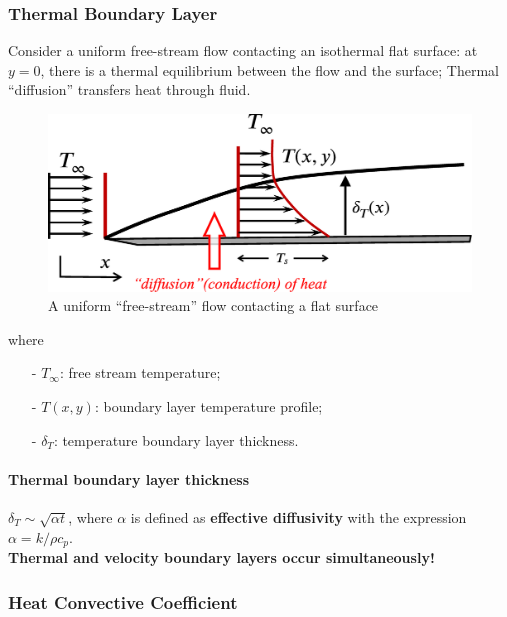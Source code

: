 \documentclass[12pt, a4paper]{article}
\numberwithin{equation}{subsection}
\begin{document}
\subsubsection{Thermal Boundary Layer}
Consider a uniform free-stream flow contacting an isothermal flat surface: at $y=0$, there is a thermal equilibrium between the flow and the surface; Thermal “diffusion” transfers heat through fluid. 
\begin{figure}[H]
    \centering
    \includegraphics[width=.7\textwidth]{img/thermal_boundary_layer.eps}
    \caption{A uniform “free-stream” flow contacting a flat surface}
    \label{fig:thermal_BL}
\end{figure}
where 
\begin{itemize}
    \item[-] $T_\infty$: free stream temperature;
    \item[-] $T(x, y)$: boundary layer temperature profile;
    \item[-] $\delta_T$: temperature boundary layer thickness.
\end{itemize}

\paragraph{Thermal boundary layer thickness} $\delta_{T} \sim \sqrt{\alpha t}$, where $\alpha$ is defined as \textbf{effective diffusivity} with the expression $\alpha= k/\rho c_{p}$.\\

\textbf{Thermal and velocity boundary layers occur simultaneously!}

\subsubsection{Heat Convective Coefficient}
\end{document}
